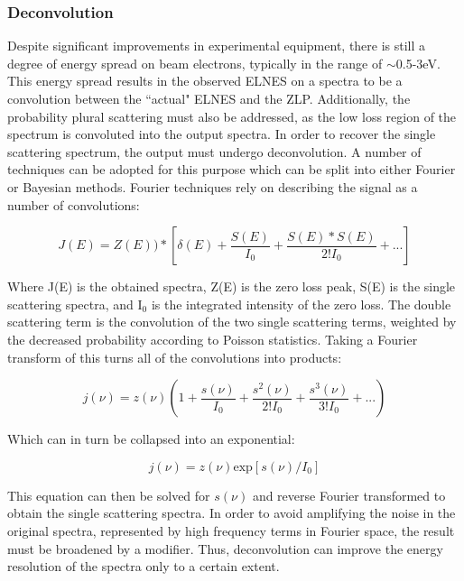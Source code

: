 \subsubsection{Deconvolution} \label{deconvolution}
Despite significant improvements in experimental equipment, there is still a degree of energy spread on beam electrons, typically in the range of $\sim$0.5-3eV.  This energy spread results in the observed ELNES on a spectra to be a convolution between the ``actual" ELNES and the ZLP.  Additionally, the probability plural scattering must also be addressed, as the low loss region of the spectrum is convoluted into the output spectra.  In order to recover the single scattering spectrum, the output must undergo deconvolution.  A number of techniques can be adopted for this purpose which can be split into either Fourier or Bayesian methods.   Fourier techniques rely on describing the signal as a number of convolutions:

\begin{equation}
 	J(E) = Z(E))\ast[\delta(E) + \frac{S(E)}{I_0} +  \frac{S(E) \ast S(E)}{2! I_0}   + ...]
\end{equation}



Where J(E) is the obtained spectra, Z(E) is the zero loss peak, S(E) is the single scattering spectra, and I$_0$ is the integrated intensity of the zero loss.  The double scattering term is the convolution of the two single scattering terms, weighted by the decreased probability according to Poisson statistics.   Taking a Fourier transform of this turns all of the convolutions into products: 

\begin{equation}
	j(\nu) = z(\nu) \left(1+\frac{s(\nu)}{I_0}+   \frac{s^2(\nu)}{2! I_0}+ \frac{s^3(\nu)}{3! I_0} + ...\right)
	\label{fourier_spectra}
\end{equation} 

Which can in turn be collapsed into an exponential:

\begin{equation}
	j(\nu) = z(\nu)\mathrm{exp}[s(\nu)/I_0]
\end{equation}

This equation can then be solved for $s(\nu)$ and reverse Fourier transformed to obtain the single scattering spectra.  In order to avoid amplifying the noise in the original spectra,  represented by high frequency terms in Fourier space, the result must be broadened by a modifier.  Thus, deconvolution can improve the energy resolution of the spectra only to a certain extent.  \\

